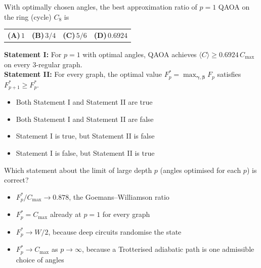 \documentclass[11pt,a4paper]{article}
\newcommand{\optlabel}[1]{\textbf{(#1)}}
\newenvironment{qitem}[1]{\begin{list}{}{\setlength{\leftmargin}{3.3em}\setlength{\labelwidth}{3.1em}%
  \setlength{\labelsep}{0.2em}\setlength{\topsep}{3pt}\setlength{\parsep}{3pt}}\item[\textbf{Q.#1}\hfill]}{\end{list}}
\newcommand{\qsep}{\par\vspace{2pt}{\color{black!15}\hrule}\vspace{4pt}}
\begin{document}
\begin{qitem}{48}
With optimally chosen angles, the best approximation ratio of $p = 1$ QAOA on the ring (cycle) $C_8$ is
\par\smallskip\noindent\begin{tabularx}{\linewidth}{@{}*{4}{L}@{}}
\optlabel{A}\,$1$ & \optlabel{B}\,$3/4$ & \optlabel{C}\,$5/6$ & \optlabel{D}\,$0.6924$
\end{tabularx}
\end{qitem}
\qsep

\begin{qitem}{49}
\textbf{Statement I:} For $p = 1$ with optimal angles, QAOA achieves $\langle C\rangle \ge 0.6924\,C_{\max}$ on every 3-regular graph.\\[1mm]
\textbf{Statement II:} For every graph, the optimal value $F_p^* = \max_{\boldsymbol\gamma,\boldsymbol\beta}F_p$ satisfies $F_{p+1}^* \ge F_p^*$.
\begin{itemize}[leftmargin=2.6em, labelsep=0.4em, itemsep=2pt, topsep=3pt]
\item[\optlabel{A}] Both Statement I and Statement II are true
\item[\optlabel{B}] Both Statement I and Statement II are false
\item[\optlabel{C}] Statement I is true, but Statement II is false
\item[\optlabel{D}] Statement I is false, but Statement II is true
\end{itemize}
\end{qitem}
\qsep

\begin{qitem}{50}
Which statement about the limit of large depth $p$ (angles optimised for each $p$) is correct?
\begin{itemize}[leftmargin=2.6em, labelsep=0.4em, itemsep=2pt, topsep=3pt]
\item[\optlabel{A}] $F_p^*/C_{\max} \to 0.878$, the Goemans--Williamson ratio
\item[\optlabel{B}] $F_p^* = C_{\max}$ already at $p = 1$ for every graph
\item[\optlabel{C}] $F_p^* \to W/2$, because deep circuits randomise the state
\item[\optlabel{D}] $F_p^* \to C_{\max}$ as $p \to \infty$, because a Trotterised adiabatic path is one admissible choice of angles
\end{itemize}
\end{qitem}
\qsep
\end{document}
